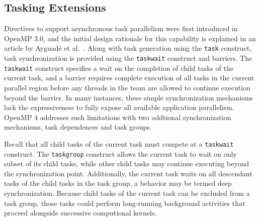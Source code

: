 \subsection{Tasking Extensions}
\label{sub:tasking}



Directives to support asynchronous task parallelism were first introduced in OpenMP 3.0, and the initial design rationale for this capability is explained in an article by Ayguad\'{e} et al.~\cite{ayguade2009tpds}.  Along with task generation using the \texttt{task} construct, task synchronization is provided using the \texttt{taskwait} construct and barriers.  The \texttt{taskwait} construct specifies a wait on the completion of child tasks of the current task, and a barrier requires complete execution of all tasks in the current parallel region before any threads in the team are allowed to continue execution beyond the barrier.  In many instances, these simple synchronization mechanisms lack the expressiveness to fully expose all available application parallelism.  OpenMP 4 addresses such limitations with two addtional synchronization mechanisms, task dependences and task groups.




Recall that all child tasks of the current task must compete at a \texttt{taskwait} construct.  The \texttt{taskgroup} construct allows the current task to wait on only subset of its child tasks, while other child tasks may continue executing beyond the synchronization point.  Additionally, the current task waits on all descendant tasks of the child tasks in the task group, a behavior may be termed deep synchronization.  Because child tasks of the current task can be excluded from a task group, those tasks could perform long-running background activities that proceed alongside successive computional kernels.




